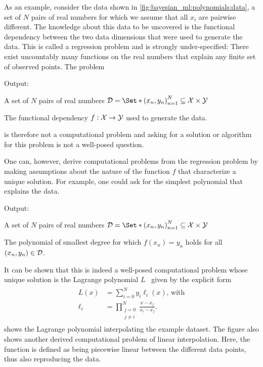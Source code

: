 As an example, consider the data shown in \cref{fig:bayesian_ml:polynomials:data}, a set of $N$ pairs of real numbers for which we assume that all $x_i$ are pairwise different.
The knowledge about this data to be uncovered is the functional dependency between the two data dimensions that were used to generate the data.
This is called a regression problem and is strongly under-specified:
There exist uncountably many functions on the real numbers that explain any finite set of observed points.
The problem
\begin{problem}[Regression]
\label{prob:bayesian_ml:regression}
\begin{labeling}{Output:}
    \item[Input:] A set of $N$ pairs of real numbers $\Dc = \Set*{\left(x_n, y_n\right)}_{n=1}^N \subseteq \Xc \times \Yc$
    \item[Output:] The functional dependency $f : \mathcal{X} \to \mathcal{Y}$ used to generate the data.
\end{labeling}
\end{problem}
is therefore not a computational problem and asking for a solution or algorithm for this problem is not a well-posed question.

One can, however, derive computational problems from the regression problem by making assumptions about the nature of the function $f$ that characterize a unique solution.
For example, one could ask for the simplest polynomial that explains the data.
\begin{problem}
\label{prob:bayesian_ml:lagrange}
\begin{labeling}{Output:}
    \item[Input:] A set of $N$ pairs of real numbers $\Dc = \Set*{\left(x_n, y_n\right)}_{n=1}^N \subseteq \Xc \times \Yc$
    \item[Output:] The polynomial of smallest degree for which $f(x_n) = y_n$ holds for all $(x_n, y_n) \in \mathcal{D}$.
\end{labeling}
\end{problem}
It can be shown that this is indeed a well-posed computational problem whose unique solution is the Lagrange polynomial $L$~\parencite{waring_vii._1779} given by the explicit form
\begin{align}
    \begin{split}
        L(x) &= \sum_{i=0}^N y_i \ell_i(x)\text{, with} \\
        \ell_i &= \prod_{\substack{j = 0\\j \neq i}}^N \frac{x - x_j}{x_i - x_j}.
    \end{split}
    \label{eq:bayesian_ml:lagrange}
\end{align}
 shows the Lagrange polynomial interpolating the example dataset.
The figure also shows another derived computational problem of linear interpolation.
Here, the function is defined as being piecewise linear between the different data points, thus also reproducing the data.

